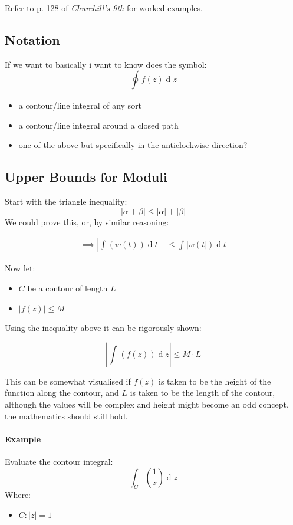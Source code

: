 \documentclass[class=article, crop=false]{standalone}
\begin{document}
Refer to p. 128 of \textit{Churchill's 9th} for worked examples.

\subsection{Notation}
If we want to basically i want to know does the symbol:
\[
\oint^{}_{} f\left( z \right)   \operatorname{d}z
\]
\begin{itemize}
  \item a contour/line integral of any sort
  \item a contour/line integral around a closed path
  \item one of the above but specifically in the anticlockwise direction?
\end{itemize}

\subsection{Upper Bounds for Moduli}

Start with the triangle inequality:
\[
    \left| \alpha + \beta \right| \leq     \left| \alpha \right| +     \left| \beta \right| 
\]
We could prove this, or, by similar reasoning:

\begin{align*}
\implies      \left| \int^{}_{}\left( w\left(  t \right)  \right) \operatorname{d}t  \right| &\leq \int^{}_{} \left| w\left( t  \right|  \right) \operatorname{d}t 
\end{align*}

   Now let:
   \begin{itemize}
     \item $C$ be a contour of length $L$
     \item  $    \left| f\left( z \right)  \right| \leq M$
   \end{itemize}

   Using the inequality above it can be rigorously shown:

   \[
       \left| \int^{}_{}\left( f\left( z \right)  \right) \operatorname{d}z  \right| \leq M\cdot L
   \]

   This can be somewhat visualised if $f\left( z \right) $ is taken to be the height of the function along the contour, and $L$ is taken to be the length of the contour, although the values will be complex and height might become an odd concept, the mathematics should still hold.
   \paragraph{Example}
   Evaluate the contour integral:
   \[
     \int^{}_{C}\left( \frac{1}{z} \right) \operatorname{d}z 
   \]
   Where:
\begin{itemize}
     \item $C:     \left| z \right| = 1$
\end{itemize}
\end{document}
